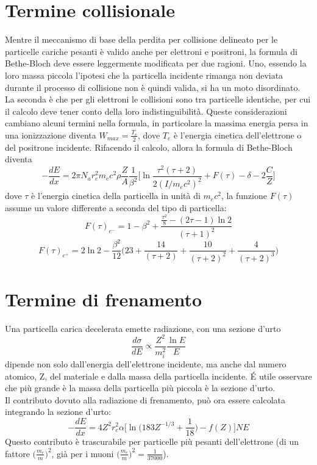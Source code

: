 \documentclass[12pt, letterpaper]{book}
\begin{document}
\section{Termine collisionale}
Mentre il meccanismo di base della perdita per collisione delineato per le particelle cariche pesanti è valido anche per elettroni e positroni, la formula di Bethe-Bloch deve essere leggermente modificata per due ragioni. Uno, essendo la loro massa piccola l'ipotesi che la particella incidente rimanga non deviata durante il processo di collisione non è quindi valida, si ha un moto disordinato. La seconda è che per gli elettroni le collisioni sono tra particelle identiche, per cui il calcolo deve tener conto della loro indistinguibilità. Queste considerazioni cambiano alcuni termini nella formula, in particolare la massima energia persa in una ionizzazione diventa $W_{max}=\frac{T_e}{2}$, dove $T_e$ è l'energia cinetica dell'elettrone o del positrone incidente. Rifacendo il calcolo, allora la formula di Bethe-Bloch diventa
$$-\frac{dE}{dx}=2\pi N_a r^2_e m_e c^2\rho \frac{Z}{A}\frac{1}{\beta^2}\bigg[ \ln{\frac{\tau^2(\tau +2)}{2(I/m_e c^2)^2}}+F(\tau)-\delta -2\frac{C}{Z} \bigg]$$
dove $\tau$ è l'energia cinetica della particella in unità di $m_e c^2$, la funzione $F(\tau)$ assume un valore differente a seconda del tipo di particella:
$$F(\tau)_{e^-}=1-\beta^2+\frac{\frac{\tau^2}{8}-(2\tau-1)\ln{2}}{(\tau+1)^2}$$
$$F(\tau)_{e^+}=2\ln{2}-\frac{\beta^2}{12}\bigg( 23+\frac{14}{(\tau+2)}+\frac{10}{(\tau+2)^2}+\frac{4}{(\tau+2)^3}\bigg)$$

\section{Termine di frenamento}
Una particella carica decelerata emette radiazione, con una sezione d'urto
$$\frac{d\sigma}{dE}\propto \frac{Z^2}{m^2_i}\frac{\ln{E}}{E}$$
dipende non solo dall'energia dell'elettrone incidente, ma anche dal numero atomico, Z, del materiale e dalla massa della particella incidente. \'E utile osservare che più grande è la massa della particella più piccola è la sezione d'urto.\\
Il contributo dovuto alla radiazione di frenamento, può ora essere calcolata integrando la sezione d'urto:
$$-\frac{dE}{dx}=4Z^2r^2_e \alpha \bigg[\ln{\bigg(183Z^{-1/3}+\frac{1}{18}\bigg)}-f(Z)\bigg]NE$$
Questo contributo è trascurabile per particelle più pesanti dell'elettrone (di un fattore $\bigg( \frac{m_e}{m}\bigg)^2$, già per i muoni $\bigg( \frac{m_e}{m}\bigg)^2=\frac{1}{37000}$).
\end{document}
